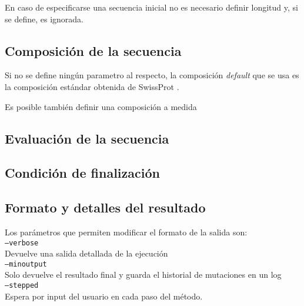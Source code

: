 En caso de especificarse una secuencia inicial no es necesario definir longitud y, si se define, es ignorada.

\subsection{Composición de la secuencia} \label{composicion}

Si no se define ningún parametro al respecto, la composición \textit{default} que se usa es la composición estándar obtenida de SwissProt \cite{compositionAA}.  

Es posible también definir una composición a medida

\subsection{Evaluación de la secuencia}\label{evaluacion}

\subsection{Condición de finalización} \label{condicionFin}

\subsection{Formato y detalles del resultado}\label{output}
Los parámetros que permiten modificar el formato de la salida son:
\vspace{0.2cm}\\
\texttt{--verbose} \\
\indent \indent Devuelve una salida detallada de la ejecución \\
\texttt{--minoutput} \\
\indent \indent Solo devuelve el resultado final y guarda el historial de mutaciones en un log \\
\texttt{--stepped} \\
\indent \indent Espera por input del usuario en cada paso del método. \\
